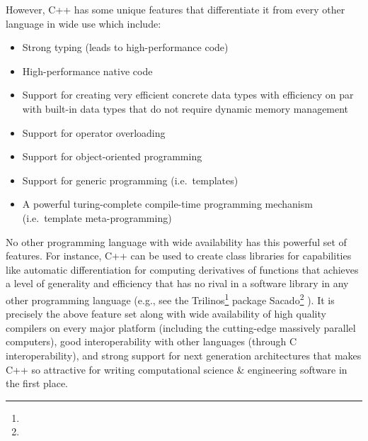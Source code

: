 \documentclass[pdf,ps2pdf,11pt]{SANDreport}
\begin{document}
However, C++ has some unique features that differentiate it from every
other language in wide use which include:

\begin{itemize}

{}\item Strong typing (leads to high-performance code)

{}\item High-performance native code

{}\item Support for creating very efficient concrete data types with
efficiency on par with built-in data types that do not require dynamic
memory management

{}\item Support for operator overloading

{}\item Support for object-oriented programming

{}\item Support for generic programming (i.e.\ templates)

{}\item A powerful turing-complete compile-time programming mechanism
(i.e.\ template meta-programming)

\end{itemize}

No other programming language with wide availability has this powerful
set of features.  For instance, C++ can be used to create class
libraries for capabilities like automatic differentiation
{}\cite{ref:ad} for computing derivatives of functions that achieves a
level of generality and efficiency that has no rival in a software
library in any other programming language (e.g., see the
Trilinos\footnote{} package
Sacado\footnote{}
{}\cite{phippsEtAl2006}).  It is precisely the above feature set along
with wide availability of high quality compilers on every major
platform (including the cutting-edge massively parallel computers),
good interoperability with other languages (through C
interoperability), and strong support for next generation
architectures {}\cite{DesignIssuesForMultiCore08} that makes C++ so
attractive for writing computational science \& engineering software
in the first place.
\end{document}
